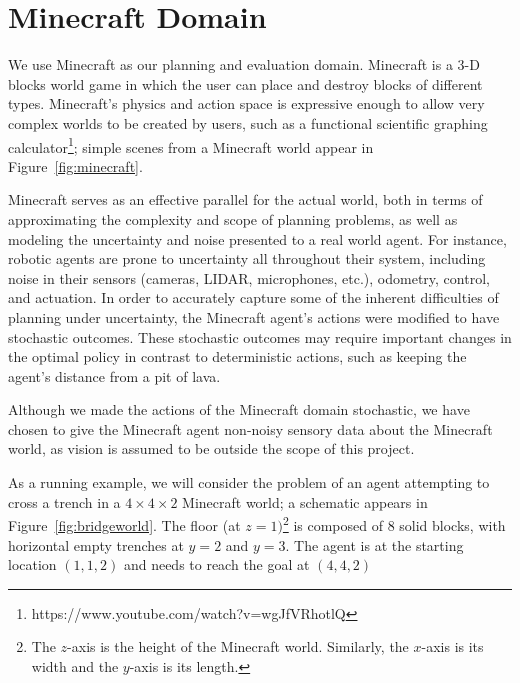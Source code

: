 \documentclass[]{article}
\begin{document}
\section{Minecraft Domain}
We use Minecraft as our planning and evaluation domain. Minecraft is a
3-D blocks world game in which the user can place and destroy blocks
of different types.  Minecraft's physics and action space is expressive
enough to allow very complex worlds to be created by users, such as a
functional scientific graphing calculator\footnote{https://www.youtube.com/watch?v=wgJfVRhotlQ};
simple scenes from a Minecraft world appear in Figure~\ref{fig:minecraft}.  

Minecraft serves as an effective parallel for the actual world, both
in terms of approximating the complexity and scope of planning
problems, as well as modeling the uncertainty and noise presented to a
real world agent.  For instance, robotic agents are prone to
uncertainty all throughout their system, including noise in their
sensors (cameras, LIDAR, microphones, etc.), odometry, control, and
actuation.  In order to accurately capture some of the inherent
difficulties of planning under uncertainty, the Minecraft agent's
actions were modified to have stochastic outcomes. These stochastic
outcomes may require important changes in the optimal policy in
contrast to deterministic actions, such as keeping the agent's
distance from a pit of lava.


 Although we made the actions of the Minecraft domain stochastic, we have chosen to give the Minecraft agent non-noisy sensory
data about the Minecraft world, as vision is assumed to be outside the scope of this
project.


As a running example, we will consider the problem of an agent
attempting to cross a trench in a $4 \times 4 \times 2$ Minecraft
world; a schematic appears in Figure~\ref{fig:bridgeworld}. The floor
(at $z = 1)$\footnote{The $z$-axis is the height of the Minecraft
  world. Similarly, the $x$-axis is its width and the $y$-axis is its
  length.} is composed of 8 solid blocks, with horizontal empty
trenches at $y = 2$ and $y = 3$. The agent is at the starting location
$(1, 1, 2)$ and needs to reach the goal at $(4,4,2)$
\end{document}

